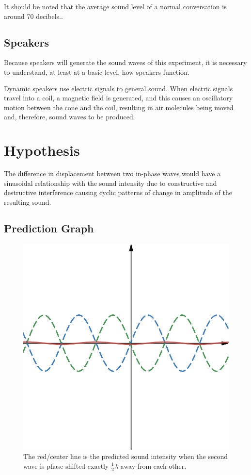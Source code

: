 \documentclass[index]{subfiles}
\begin{document}
It should be noted that the average sound level of a normal conversation is around 70 decibels.\cite{speakers}.

\subsection{Speakers}

Because speakers will generate the sound waves of this experiment, it is necessary to understand, at least at a basic level, how speakers function.\cite{speakers}

Dynamic speakers use electric signals to general sound. When electric signals travel into a coil, a magnetic field is generated, and this causes an oscillatory motion between the cone and the coil\cites{openstax}{speakers}, resulting in air molecules being moved and, therefore, sound waves to be produced.

\section{Hypothesis}

The difference in displacement between two in-phase waves would have a sinusoidal relationship with the sound intensity due to constructive and destructive interference causing cyclic patterns of change in amplitude of the resulting sound.

\subsection{Prediction Graph}

\begin{figure}[H]
    \centering
    \includegraphics[scale=0.3]{res/prediction.png}
    \caption{The red/center line is the predicted sound intensity when the second wave is phase-shifted exactly \(\frac{1}{2}\lambda \) away from each other.}
\end{figure}
\end{document}
